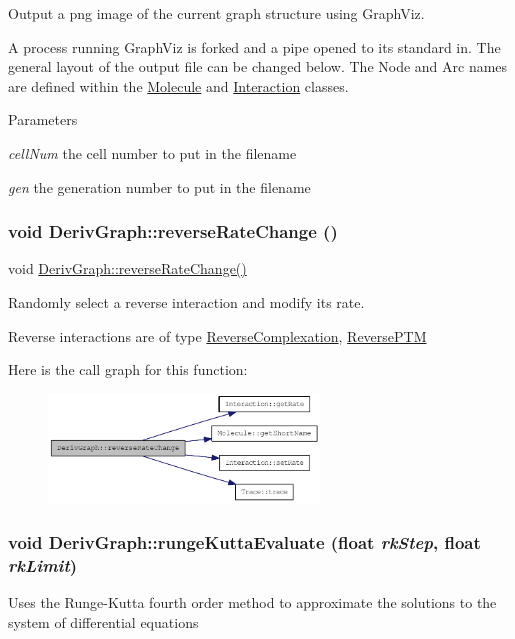 Output a png image of the current graph structure using GraphViz.

A process running GraphViz is forked and a pipe opened to its standard in. The general layout of the output file can be changed below. The Node and Arc names are defined within the \hyperlink{classMolecule}{Molecule} and \hyperlink{classInteraction}{Interaction} classes.


\begin{DoxyParams}{Parameters}
\item[{\em cellNum}]the cell number to put in the filename \item[{\em gen}]the generation number to put in the filename \end{DoxyParams}
\hypertarget{classDerivGraph_aae8c58e1d6be852efbe1ed6593f31eca}{
\subsubsection[{reverseRateChange}]{\setlength{\rightskip}{0pt plus 5cm}void DerivGraph::reverseRateChange ()}}
\label{classDerivGraph_aae8c58e1d6be852efbe1ed6593f31eca}
void \hyperlink{classDerivGraph_aae8c58e1d6be852efbe1ed6593f31eca}{DerivGraph::reverseRateChange()}

Randomly select a reverse interaction and modify its rate.

Reverse interactions are of type \hyperlink{classReverseComplexation}{ReverseComplexation}, \hyperlink{classReversePTM}{ReversePTM} 

Here is the call graph for this function:\nopagebreak
\begin{figure}[H]
\begin{center}
\leavevmode
\includegraphics[width=204pt]{classDerivGraph_aae8c58e1d6be852efbe1ed6593f31eca_cgraph}
\end{center}
\end{figure}
\hypertarget{classDerivGraph_aa0921b8a7407be67085e9a11750a7263}{
\subsubsection[{rungeKuttaEvaluate}]{\setlength{\rightskip}{0pt plus 5cm}void DerivGraph::rungeKuttaEvaluate (float {\em rkStep}, \/  float {\em rkLimit})}}
\label{classDerivGraph_aa0921b8a7407be67085e9a11750a7263}
Uses the Runge-\/Kutta fourth order method to approximate the solutions to the system of differential equations

